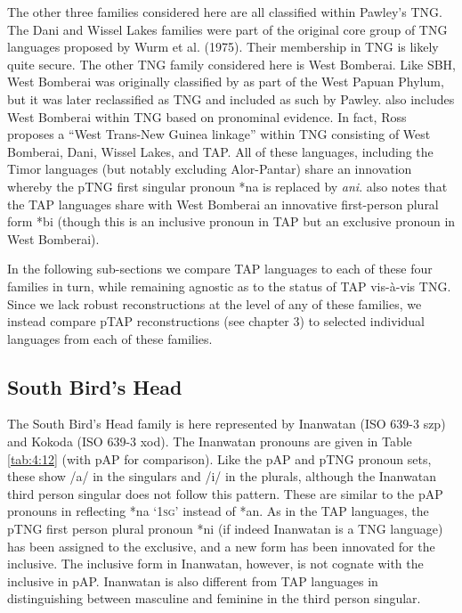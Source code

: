 The other three families considered here are all classified within Pawley's TNG. The Dani and Wissel Lakes families were part of the original core group of TNG languages proposed by Wurm et al. (1975). Their membership in TNG is likely quite secure. The other TNG family considered here is West Bomberai. Like SBH, West Bomberai was originally classified by \citet{Cowan1957} as part of the West Papuan Phylum, but it was later reclassified as TNG and included as such by Pawley. \citet{Ross2005} also includes West Bomberai within TNG based on pronominal evidence. In fact, Ross proposes a ``West Trans-New Guinea linkage'' within TNG consisting of West Bomberai, Dani, Wissel Lakes, and TAP. All of these languages, including the Timor languages (but notably excluding Alor-Pantar) share an innovation whereby the pTNG first singular pronoun *na is replaced by \textit{ani}. \citet[37]{Ross2005} also notes that the TAP languages share with West Bomberai an innovative first-person plural form *bi (though this is an inclusive
pronoun in TAP but an exclusive pronoun in West Bomberai).

In the following sub-sections we compare TAP languages to each of these four families in turn, while remaining agnostic as to the status of TAP vis-\`a-vis TNG. Since we lack robust reconstructions at the level of any of these families, we instead compare pTAP reconstructions (see chapter 3) to selected individual languages from each of these families.

\subsection{South Bird's Head}
The South Bird's Head family is here represented by Inanwatan (ISO 639-3 szp) and Kokoda (ISO 639-3 xod). The Inanwatan pronouns are given in Table \ref{tab:4:12} (with pAP for comparison). Like the pAP and pTNG pronoun sets, these show /a/ in the singulars and /i/ in the plurals, although the Inanwatan third person singular does not follow this pattern. These are similar to the pAP pronouns in reflecting *na `\textsc{1sg}' instead of *an. As in the TAP languages, the pTNG first person plural pronoun *ni (if indeed Inanwatan is a TNG language) has been assigned to the exclusive, and a new form has been innovated for the inclusive. The inclusive form in Inanwatan, however, is not cognate with the inclusive in pAP. Inanwatan is also different from TAP languages in distinguishing between masculine and feminine in the third person singular.


